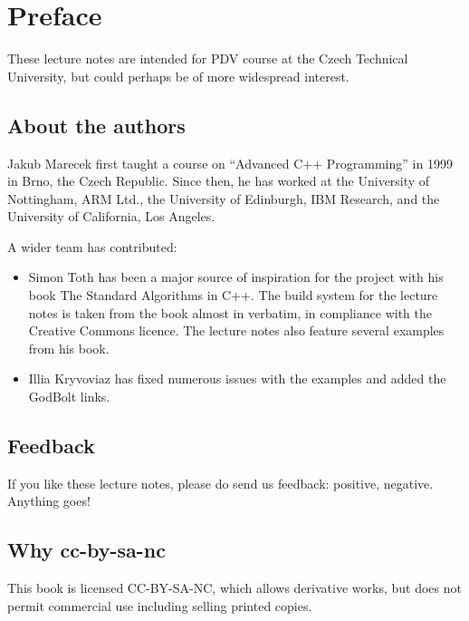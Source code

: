 \chapter{Preface}

These lecture notes are intended for PDV course at the Czech Technical University, but could perhaps be of more widespread interest. 

\section*{About the authors}

Jakub Marecek first taught a course on ``Advanced C++ Programming'' in 1999 in Brno, the Czech Republic. Since then, he has worked at the University of Nottingham, ARM Ltd., the University of Edinburgh, IBM Research, and the University of California, Los Angeles.

A wider team has contributed:
\begin{itemize}
\item Simon Toth has been a major source of inspiration for the project with his book The Standard Algorithms in C++. The build system for the lecture notes is taken from the book almost in verbatim, in compliance with the Creative Commons licence. The lecture notes also feature several examples from his book. 
\item Illia Kryvoviaz has fixed numerous issues with the examples and added the GodBolt links. 
\end{itemize}

\section*{Feedback}

If you like these lecture notes, please do send us feedback: positive, negative. Anything goes!

\section*{Why cc-by-sa-nc}

This book is licensed CC-BY-SA-NC, which allows derivative works, but does not permit commercial use including selling printed copies. 